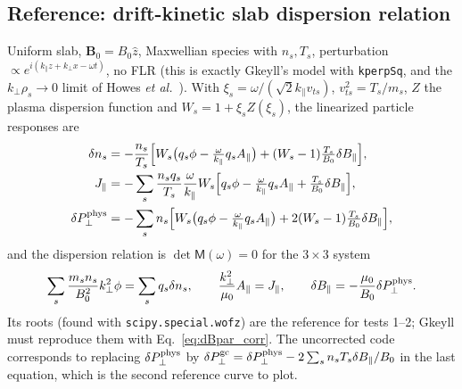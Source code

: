 \documentclass[11pt, letterpaper]{article}
\newcommand{\dBpar}{\delta B_\parallel}
\newcommand{\Apar}{A_\parallel}
\newcommand{\code}[1]{\texttt{#1}}
\begin{document}
\subsection{Reference: drift-kinetic slab dispersion relation}
\label{sec:disp}
Uniform slab, $\mathbf{B}_0=B_0\hat z$, Maxwellian species with $n_s,T_s$, perturbation
$\propto e^{i(k_\parallel z + k_\perp x - \omega t)}$, no FLR (this is exactly Gkeyll's model with
\code{kperpSq}, and the $k_\perp\rho_s\to0$ limit of Howes \emph{et al.}~\cite{Howes2006}). With
$\xi_s = \omega/(\sqrt2 k_\parallel v_{ts})$, $v_{ts}^2=T_s/m_s$, $Z$ the plasma dispersion
function and $W_s = 1+\xi_sZ(\xi_s)$, the linearized particle responses are
\begin{align}
  \delta n_s &= -\frac{n_s}{T_s}\Big[W_s\big(q_s\phi - \tfrac{\omega}{k_\parallel}q_s\Apar\big)
                 + (W_s-1)\tfrac{T_s}{B_0}\dBpar\Big],\\
  J_\parallel &= -\sum_s\frac{n_sq_s}{T_s}\frac{\omega}{k_\parallel}W_s
                 \Big[q_s\phi - \tfrac{\omega}{k_\parallel}q_s\Apar + \tfrac{T_s}{B_0}\dBpar\Big],\\
  \delta P_\perp^{\rm phys} &= -\sum_s n_s\Big[W_s\big(q_s\phi - \tfrac{\omega}{k_\parallel}q_s\Apar\big)
                 + 2(W_s-1)\tfrac{T_s}{B_0}\dBpar\Big],
\end{align}
and the dispersion relation is $\det\mathsf{M}(\omega)=0$ for the $3\times3$ system
\begin{equation}
  \sum_s\frac{m_sn_s}{B_0^2}k_\perp^2\phi = \sum_s q_s\delta n_s,\qquad
  \frac{k_\perp^2}{\mu_0}\Apar = J_\parallel,\qquad
  \dBpar = -\frac{\mu_0}{B_0}\delta P_\perp^{\rm phys}.
  \label{eq:disp}
\end{equation}
Its roots (found with \code{scipy.special.wofz}) are the reference for tests 1--2; Gkeyll must
reproduce them with Eq.~\eqref{eq:dBpar_corr}. The uncorrected code corresponds to replacing
$\delta P^{\rm phys}_\perp$ by $\delta P^{\rm gc}_\perp = \delta P^{\rm phys}_\perp - 2\sum_s n_sT_s\dBpar/B_0$
in the last equation, which is the second reference curve to plot.
\end{document}
